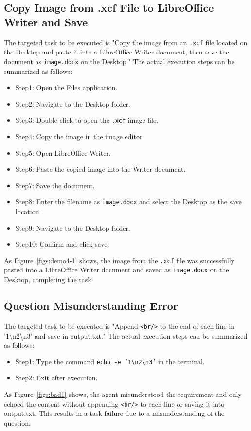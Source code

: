 \subsection{Copy Image from .xcf File to LibreOffice Writer and Save}
The targeted task to be executed is "Copy the image from an \texttt{.xcf} file located on the Desktop and paste it into a LibreOffice Writer document, then save the document as \texttt{image.docx} on the Desktop." The actual execution steps can be summarized as follows:
\begin{itemize}
    \item Step1: Open the Files application.
    \item Step2: Navigate to the Desktop folder.
    \item Step3: Double-click to open the \texttt{.xcf} image file.
    \item Step4: Copy the image in the image editor.
    \item Step5: Open LibreOffice Writer.
    \item Step6: Paste the copied image into the Writer document.
    \item Step7: Save the document.
    \item Step8: Enter the filename as \texttt{image.docx} and select the Desktop as the save location.
    \item Step9: Navigate to the Desktop folder.
    \item Step10: Confirm and click save.
\end{itemize}
As Figure~\ref{figs:demo4-1} shows, the image from the \texttt{.xcf} file was successfully pasted into a LibreOffice Writer document and saved as \texttt{image.docx} on the Desktop, completing the task.

\subsection{Question Misunderstanding Error}
The targeted task to be executed is "Append \texttt{<br/>} to the end of each line in '1\textbackslash n2\textbackslash n3' and save in output.txt." The actual execution steps can be summarized as follows:
\begin{itemize}
    \item Step1: Type the command \texttt{echo -e '1\textbackslash n2\textbackslash n3'} in the terminal.
    \item Step2: Exit after execution.
\end{itemize}
As Figure~\ref{figs:bad1} shows, the agent misunderstood the requirement and only echoed the content without appending \texttt{<br/>} to each line or saving it into output.txt. This results in a task failure due to a misunderstanding of the question.

